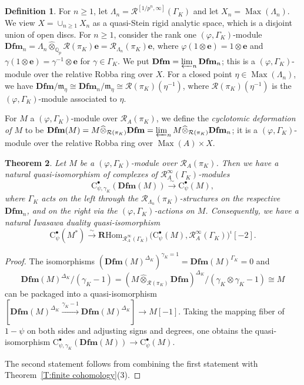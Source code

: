 \documentclass[12pt]{article}
\newtheorem{theorem}{Theorem}[subsection]
\theoremstyle{definition}
\newtheorem{defn}[theorem]{Definition}
\numberwithin{equation}{theorem}
\newcommand{\calR}{\mathcal{R}}
\newcommand{\gothm}{\mathfrak{m}}
\newcommand{\QQ}{\mathbb{Q}}
\newcommand{\bbe}{\mathbf{e}}
\newcommand{\bbR}{\mathbf{R}}
\newcommand{\rmC}{\mathrm{C}}
\newcommand{\Dfm}{\mathbf{Dfm}}
\def\Qp{\QQ_p}
\newcommand{\RHom}{\bbR\mathrm{Hom}}
\DeclareMathOperator{\Max}{Max}
\begin{document}
\begin{defn}
\label{D:Iwasawa deformation space}
For $n \geq 1$, let $\Lambda_n = \calR^{[1/p^n,\infty]}(\Gamma_K)$ and
let $X_n = \Max(\Lambda_n)$.  We view $X = \cup_{n\geq1} X_n$ as a
quasi-Stein rigid analytic space, which is a disjoint union of open
discs.  For $n \geq 1$, consider the rank one $(\varphi,
\Gamma_K)$-module $\mathbf{Dfm}_n = \Lambda_n \widehat \otimes_{\Qp}
\calR(\pi_K)\bbe = \calR_{\Lambda_n}(\pi_K)\bbe$, where $\varphi(1
\otimes \bbe) = 1\otimes \bbe$ and $\gamma(1 \otimes \bbe) =
\gamma^{-1}\otimes \bbe$ for $\gamma \in \Gamma_K$.  We put $\Dfm =
\varprojlim_n \Dfm_n$; this is a $(\varphi, \Gamma_K)$-module over the
relative Robba ring over $X$.  For a closed point $\eta \in
\Max(\Lambda_n)$, we have $\Dfm/\gothm_\eta\cong \Dfm_n/\gothm_\eta
\cong \calR(\pi_K)(\eta^{-1})$, where $\calR(\pi_K)(\eta^{-1})$ is the
$(\varphi, \Gamma_K)$-module associated to $\eta$.

For $M$ a $(\varphi, \Gamma_K)$-module over $\calR_A(\pi_K)$, we
define the \emph{cyclotomic deformation of $M$} to be $\Dfm(M) = M
\widehat \otimes_{\calR(\pi_K)} \Dfm = \varprojlim_n M
\widehat\otimes_{\calR(\pi_K)} \Dfm_n$; it is a $(\varphi,
\Gamma_K)$-module over the relative Robba ring over $\Max(A) \times
X$.
\end{defn}



\begin{theorem}
\label{T:comparison iwasawa v.s. deformation} 
Let  $M$ be a $(\varphi, \Gamma_K)$-module over $\calR_A(\pi_K)$.  Then we have a natural quasi-isomorphism of complexes of $\calR_A^\infty(\Gamma_K)$-modules
\begin{equation}
\label{E:comparison iwasawa v.s. deformation}
\rmC^\bullet_{\psi, \gamma_K}(\Dfm(M)) \xrightarrow\sim \rmC^\bullet_\psi(M),
\end{equation}
where $\Gamma_K$ acts on the left through the $\calR_{\Lambda_n}(\pi_K)$-structures on the respective $\Dfm_n$, and on the right via the $(\varphi,\Gamma_K)$-actions on $M$.
Consequently, we have a natural Iwasawa duality quasi-isomorphism
\begin{equation}\label{E:iwasawa duality qisom}
\rmC^\bullet_\psi(M^*)
\xrightarrow\sim \RHom_{\calR_A^\infty(\Gamma_K)} \big(\rmC^\bullet_\psi(M), \calR_A^\infty(\Gamma_K))^\iota[-2].
\end{equation}
\end{theorem}

\begin{proof}
The isomorphisms $(\Dfm(M)^{\Delta_K})^{\gamma_K=1} =
\Dfm(M)^{\Gamma_K} = 0$ and
\[
\Dfm(M)^{\Delta_K}/(\gamma_K-1) = (M \widehat\otimes_{\calR(\pi_K)}
\Dfm)^{\Delta_K}/(\gamma_K \otimes \gamma_K-1) \cong M
\]
can be packaged into a quasi-isomorphism $[\Dfm(M)^{\Delta_K}
  \xrightarrow{\gamma_K-1} \Dfm(M)^{\Delta_K}] \to M[-1]$.  Taking the
mapping fiber of $1-\psi$ on both sides and adjusting signs and
degrees, one obtains the quasi-isomorphism
$\rmC_{\psi,\gamma_K}^\bullet(\Dfm(M)) \to \rmC_\psi^\bullet(M)$.

The second statement follows from combining the first statement with Theorem~\ref{T:finite cohomology}(3). 
\end{proof}
\end{document}

